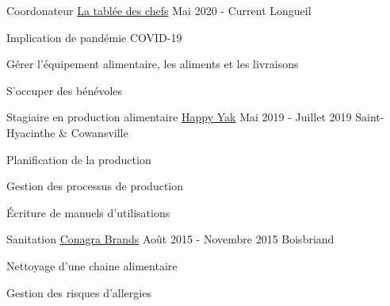 

\begin{cventries}

  \cventry
    {Coordonateur} %
    {\href{https://www.tableedeschefs.org/en/}{La tablée des chefs}} %
    {Mai 2020 - Current} %
    {Longueil} %
    {
      \begin{cvitems} %
        \item {Implication de pandémie COVID-19}
        \item {Gérer l'équipement alimentaire, les aliments et les livraisons}
        \item {S'occuper des bénévoles}
      \end{cvitems}
    }

  \cventry
    {Stagiaire en production alimentaire} %
    {\href{https://happyyak.ca/en/}{Happy Yak}} %
    {Mai 2019 - Juillet 2019} %
    {Saint-Hyacinthe \& Cowansville} %
    {
      \begin{cvitems} %
        \item {Planification de la production}
        \item {Gestion des processus de production}
        \item {Écriture de manuels d'utilisations}
      \end{cvitems}
    }

  \cventry
    {Sanitation} %
    {\href{http://www.conagrabrands.ca/en/brands}{Conagra Brands}} %
    {Août 2015 - Novembre 2015} %
    {Boisbriand} %
    {
      \begin{cvitems} %
        \item {Nettoyage d'une chaine alimentaire}
        \item {Gestion des risques d'allergies}
      \end{cvitems}
    }


\end{cventries}
